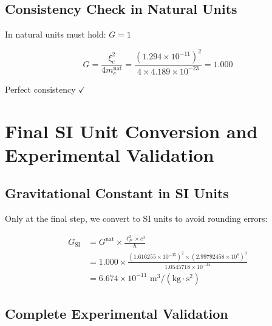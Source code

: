 \documentclass[12pt,a4paper]{article}
\begin{document}
	\subsection{Consistency Check in Natural Units}
	
	In natural units must hold: $G = 1$
	
	\begin{equation}
		G = \frac{\xi_e^2}{4m_e^{\text{nat}}} = \frac{(1.294 \times 10^{-11})^2}{4 \times 4.189 \times 10^{-23}} = 1.000
	\end{equation}
	
	Perfect consistency $\checkmark$
	
	\section{Final SI Unit Conversion and Experimental Validation}
	
	\subsection{Gravitational Constant in SI Units}
	
	Only at the final step, we convert to SI units to avoid rounding errors:
	
	\begin{align}
		G_{\text{SI}} &= G^{\text{nat}} \times \frac{\ell_P^2 \times c^3}{\hbar}\\
		&= 1.000 \times \frac{(1.616255 \times 10^{-35})^2 \times (2.99792458 \times 10^8)^3}{1.0545718 \times 10^{-34}}\\
		&= 6.674 \times 10^{-11} \text{ m}^3/(\text{kg} \cdot \text{s}^2)
	\end{align}
	
	\subsection{Complete Experimental Validation}
	
\end{document}
